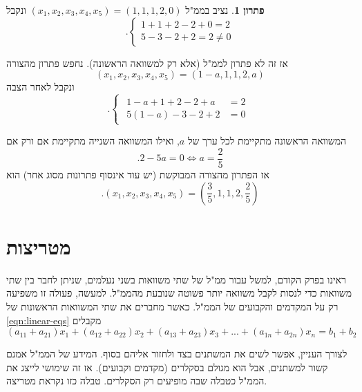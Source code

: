 \documentclass[12pt]{report}
\theoremstyle{plain}
\theoremstyle{definition}
\newtheorem*{solution}{פתרון}
\newcommand{\0}{\mathbf{0}}
\begin{document}
\begin{solution}
נציב בממ"ל 
$(x_1,x_2,x_3,x_4,x_5)=(1,1,1,2,0)$ 
ונקבל
$$
.\begin{cases}
1+1+2-2+0=2 \\
5-3-2+2=2\neq 0
\end{cases}
$$

אז זה לא פתרון לממ"ל (אלא רק למשוואה הראשונה). נחפש פתרון מהצורה
$$(x_1,x_2,x_3,x_4,x_5)=(1-a,1,1,2,a)$$
ונקבל לאחר הצבה
$$
.\begin{cases}
\begin{aligned}
1-a+1+2-2+a&=2 \\
5(1-a)-3-2+2&=0
\end{aligned}
\end{cases}
$$

המשוואה הראשונה מתקיימת לכל ערך של
$a$,
ואילו המשוואה השנייה מתקיימת אם ורק אם 
$$
.2-5a=0 \iff a=\frac{2}{5}
$$
אז הפתרון מהצורה המבוקשת (יש עוד אינסוף פתרונות מסוג אחר) הוא
$$
.(x_1,x_2,x_3,x_4,x_5)=(\frac{3}{5},1,1,2,\frac{2}{5})
$$
\end{solution}


\section{מטריצות}

ראינו בפרק הקודם, למשל עבור ממ"ל של שתי משוואות בשני נעלמים, שניתן לחבר בין שתי משוואות כדי לנסות לקבל משוואה יותר פשוטה שנובעת מהממ"ל. למעשה, פעולה זו משפיעה רק
על המקדמים והקבועים של הממ"ל. כאשר מחברים את שתי המשוואות
הראשונות של 
\ref{eqn:linear-eqs}
מקבלים
$$
(a_{11}+a_{21})x_1+(a_{12}+a_{22})x_2+(a_{13}+a_{23})x_3+...+(a_{1n}+a_{2n})x_n=b_1+b_2
$$

לצורך העניין, אפשר לשים את המשתנים בצד ולחזור אליהם בסוף. המידע של
הממ"ל אמנם קשור למשתנים, אבל הוא מגולם בסקלרים (מקדמים
וקבועים). אז זה שימושי לייצג את הממ"ל כטבלה שבה מופיעים
רק הסקלרים. טבלה כזו נקראת מטריצה.
\end{document}

